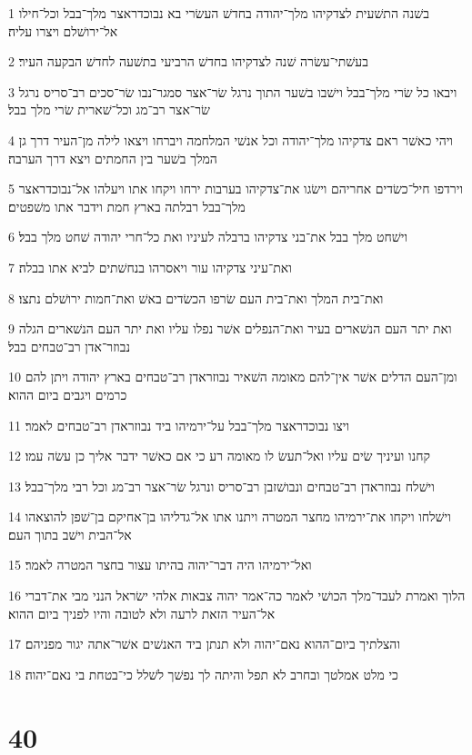 \par 1 בשׁנה התשׁעית לצדקיהו מלך־יהודה בחדשׁ העשׂרי בא נבוכדראצר מלך־בבל וכל־חילו אל־ירושׁלם ויצרו עליה׃
\par 2 בעשׁתי־עשׂרה שׁנה לצדקיהו בחדשׁ הרביעי בתשׁעה לחדשׁ הבקעה העיר׃
\par 3 ויבאו כל שׂרי מלך־בבל וישׁבו בשׁער התוך נרגל שׂר־אצר סמגר־נבו שׂר־סכים רב־סריס נרגל שׂר־אצר רב־מג וכל־שׁארית שׂרי מלך בבל׃
\par 4 ויהי כאשׁר ראם צדקיהו מלך־יהודה וכל אנשׁי המלחמה ויברחו ויצאו לילה מן־העיר דרך גן המלך בשׁער בין החמתים ויצא דרך הערבה׃
\par 5 וירדפו חיל־כשׂדים אחריהם וישׂגו את־צדקיהו בערבות ירחו ויקחו אתו ויעלהו אל־נבוכדראצר מלך־בבל רבלתה בארץ חמת וידבר אתו משׁפטים׃
\par 6 וישׁחט מלך בבל את־בני צדקיהו ברבלה לעיניו ואת כל־חרי יהודה שׁחט מלך בבל׃
\par 7 ואת־עיני צדקיהו עור ויאסרהו בנחשׁתים לביא אתו בבלה׃
\par 8 ואת־בית המלך ואת־בית העם שׂרפו הכשׂדים באשׁ ואת־חמות ירושׁלם נתצו׃
\par 9 ואת יתר העם הנשׁארים בעיר ואת־הנפלים אשׁר נפלו עליו ואת יתר העם הנשׁארים הגלה נבוזר־אדן רב־טבחים בבל׃
\par 10 ומן־העם הדלים אשׁר אין־להם מאומה השׁאיר נבוזראדן רב־טבחים בארץ יהודה ויתן להם כרמים ויגבים ביום ההוא׃
\par 11 ויצו נבוכדראצר מלך־בבל על־ירמיהו ביד נבוזראדן רב־טבחים לאמר׃
\par 12 קחנו ועיניך שׂים עליו ואל־תעשׂ לו מאומה רע כי אם כאשׁר ידבר אליך כן עשׂה עמו׃
\par 13 וישׁלח נבוזראדן רב־טבחים ונבושׁזבן רב־סריס ונרגל שׂר־אצר רב־מג וכל רבי מלך־בבל׃
\par 14 וישׁלחו ויקחו את־ירמיהו מחצר המטרה ויתנו אתו אל־גדליהו בן־אחיקם בן־שׁפן להוצאהו אל־הבית וישׁב בתוך העם׃
\par 15 ואל־ירמיהו היה דבר־יהוה בהיתו עצור בחצר המטרה לאמר׃
\par 16 הלוך ואמרת לעבד־מלך הכושׁי לאמר כה־אמר יהוה צבאות אלהי ישׂראל הנני מבי את־דברי אל־העיר הזאת לרעה ולא לטובה והיו לפניך ביום ההוא׃
\par 17 והצלתיך ביום־ההוא נאם־יהוה ולא תנתן ביד האנשׁים אשׁר־אתה יגור מפניהם׃
\par 18 כי מלט אמלטך ובחרב לא תפל והיתה לך נפשׁך לשׁלל כי־בטחת בי נאם־יהוה׃

\chapter{40}

